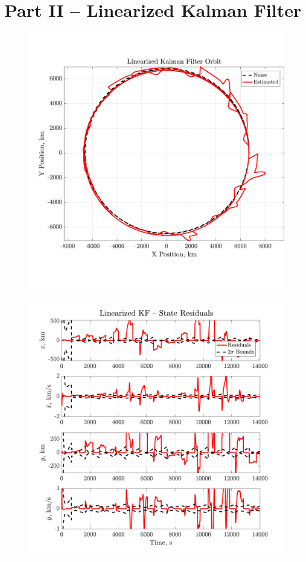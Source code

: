 \documentclass[a4paper]{aiaa-tc}
\begin{document}
 


\section*{Part II -- Linearized Kalman Filter}
 \begin{figure}[H]
 \centering
 \includegraphics[width=\textwidth]{Figures/LKF_orbit.pdf}
 \end{figure}
 
  \begin{figure}[H]
 \centering
 \includegraphics[width=\textwidth]{Figures/LKF_residuals.pdf}
 \end{figure}
 
\end{document}

